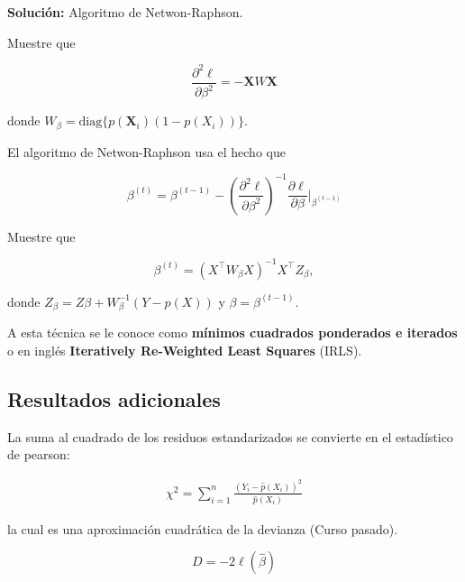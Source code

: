 \documentclass[
  12pt,
]{book}
\begin{document}
\textbf{Solución:} Algoritmo de Netwon-Raphson.

\begin{exercise}
Muestre que

\begin{equation*}
\frac{\partial^{2} \ell}{\partial \beta^{2}} = -\boldsymbol{X}W\boldsymbol{X} 
\end{equation*}

donde \(W_\beta = \mathrm{diag}\{p(\boldsymbol{X}_{i})(1-p(X_{i}))\}\).

\end{exercise}

El algoritmo de Netwon-Raphson usa el hecho que

\begin{equation*}
\beta^{(t)} = \beta ^{(t-1)} - \left(  \frac{\partial^{2} \ell}{\partial \beta^{2}}\right)^{-1} \frac{\partial \ell}{\partial \beta}  \Bigg\vert_{\beta ^{(t-1)}}
\end{equation*}

\begin{exercise}
Muestre que

\begin{equation*}
\beta^{(t)} = \left( X^{\top}W_\beta X \right)^{-1}X^{\top}Z_{\beta},
\end{equation*}

donde \(Z_{\beta} = Z\beta + W^{-1}_{\beta} (Y-p(X))\) y
\(\beta=\beta^{(t-1)}\).

\end{exercise}

A esta técnica se le conoce como \textbf{mínimos cuadrados ponderados e
iterados} o en inglés \textbf{Iteratively Re-Weighted Least Squares}
(IRLS).

\hypertarget{resultados-adicionales}{%
\subsection{Resultados adicionales}\label{resultados-adicionales}}

La suma al cuadrado de los residuos estandarizados se convierte en el
estadístico de pearson:

\begin{align*}
\chi^{2}=\sum_{i=1}^{n} \frac{\left(Y_{i}-\hat{p}(X_{i})\right)^{2}}{\hat{p}(X_{i})}
\end{align*}

la cual es una aproximación cuadrática de la devianza (Curso pasado).

\begin{equation*}
D = -2 \ell(\hat{\beta})
\end{equation*}
\end{document}
